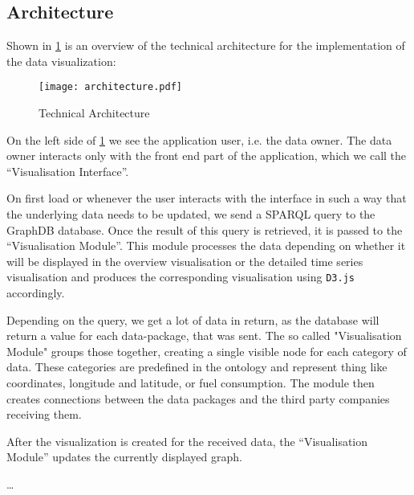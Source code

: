 \documentclass[../paper.tex]{subfiles}
\begin{document}
  \subsection{Architecture}

  Shown in \cref{fig:architecture} is an overview of the technical architecture
  for the implementation of the data visualization:

  \begin{figure}
    \centering
    \texttt{[image: architecture.pdf]}
    \caption{Technical Architecture}
    \label{fig:architecture}
  \end{figure}

  On the left side of \cref{fig:architecture} we see the application user, i.e.
  the data owner. The data owner interacts only with the front end part of the
  application, which we call the “Visualisation Interface”.

  On first load or whenever the user interacts with the interface in such a way
  that the underlying data needs to be updated, we send a SPARQL query to the
  GraphDB database. Once the result of this query is retrieved, it is passed to
  the “Visualisation Module”. This module processes the data depending on
  whether it will be displayed in the overview visualisation or the detailed
  time series visualisation and produces the corresponding visualisation
  using \texttt{D3.js} accordingly.

  Depending on the query, we get a lot of data in return, as the database
  will return a value for each data-package, that was sent. The so called
  "Visualisation Module" groups those together, creating a single visible
  node for each category of data. These categories are predefined in the
  ontology and represent thing like coordinates, longitude and latitude, or
  fuel consumption. The module then creates connections between the data packages
  and the third party companies receiving them.

  After the visualization is created for the received data, the “Visualisation Module”
  updates the currently displayed graph.


  …
\end{document}
